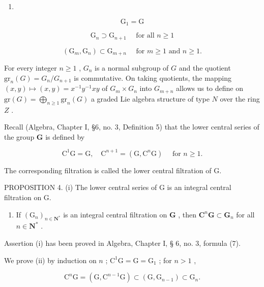 \begin{enumerate}
\def\labelenumi{(\roman{enumi})}
\tightlist
\item
\end{enumerate}

\[
\mathrm{G} _ {1} = \mathrm{G}\tag{i}
\]

\[
\mathrm{G} _ {n} \supset \mathrm{G} _ {n + 1} \quad \text { for   all } n \geqslant 1\tag{ii}
\]

\[
\left(\mathrm{G} _ {m}, \mathrm{G} _ {n}\right) \subset \mathrm{G} _ {m + n} \quad \text { for } m \geqslant 1 \text { and } n \geqslant 1.\tag{iii}
\]

For every integer \(n \geqslant 1\) , \(G_n\) is a normal subgroup of \(G\) and the quotient \(\mathrm{gr}_n(G) = G_n / G_{n+1}\) is commutative. On taking quotients, the mapping \((x,y) \mapsto (x,y) = x^{-1}y^{-1}xy\) of \(G_m \times G_n\) into \(G_{m+n}\) allows us to define on \(\mathrm{gr}(G) = \bigoplus_{n \geqslant 1} \mathrm{gr}_n(G)\) a graded Lie algebra structure of type \(N\) over the ring \(Z\) .

Recall (Algebra, Chapter I, §6, no. 3, Definition 5) that the lower central series of the group \(\mathbf{G}\) is defined by

\[
\mathrm{C} ^ {1} \mathrm{G} = \mathrm{G}, \quad \mathrm{C} ^ {n + 1} = (\mathrm{G}, \mathrm{C} ^ {n} \mathrm{G}) \quad \text { for } n \geqslant 1.\tag{28}
\]

The corresponding filtration is called the lower central filtration of G.

PROPOSITION 4. (i) The lower central series of G is an integral central filtration on G.

\begin{enumerate}
\def\labelenumi{(\roman{enumi})}
\setcounter{enumi}{1}
\tightlist
\item
  If \((\mathrm{G}_n)_{n\in \mathbf{N}^*}\) is an integral central filtration on \(\mathbf{G}\) , then \(\mathbf{C}^n\mathbf{G}\subset \mathbf{G}_n\) for all \(n\in \mathbf{N}^*\) .
\end{enumerate}

Assertion (i) has been proved in Algebra, Chapter I, § 6, no. 3, formula (7).

We prove (ii) by induction on \(n\) ; \(\mathrm{C}^1\mathrm{G} = \mathrm{G} = \mathrm{G}_1\) ; for \(n > 1\) ,

\[
\mathrm{C} ^ {n} \mathrm{G} = (\mathrm{G}, \mathrm{C} ^ {n - 1} \mathrm{G}) \subset (\mathrm{G}, \mathrm{G} _ {n - 1}) \subset \mathrm{G} _ {n}.
\]

